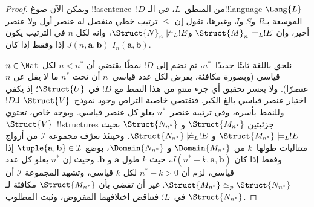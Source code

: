 \documentclass[../../../include/open-logic-section]{subfiles}
\begin{document}
\begin{proof}
ويمكن الآن صوغ !!a{sentence}~$!D$ من المنطق~$L$، في الـ!!{language}
$\Lang{L}$ الموسعة بـ$R$ و$S$ و$J$ وغيرها، تقول إن $\le$ ترتيب خطي
منفصل له عنصر أول ولا عنصر أخير، وإن
$\Struct{M}_n \models_L !E$ و$\Struct{N}_n \not\models_L !E$، وإنه لكل
$n$ في الترتيب يكون $J(n,\mathbf{a},\mathbf{b})$ إذا وفقط إذا كان
$I_n(\mathbf{a},\mathbf{b})$.

نلحق باللغة ثابتًا جديدًا~$n^*$، ثم نضم إلى $!D$ نمطًا يقتضي أن
$\bar n < n^*$ لكل $n \in \Nat$ قياسي (وبصورة مكافئة، يفرض لكل عدد
قياسي~$n$ أن تحت $n^*$ ما لا يقل عن $n$ عنصرًا). ولا يعسر تحقيق أي جزء منتهٍ من هذا
النمط مع $!D$ في $\Struct{U}$؛ إذ يكفي اختيار عنصر قياسي بالغ الكبر.
فتقتضي خاصية التراص وجود نموذج~$\Struct{V}$ لـ$!D$ وللنمط بأسره، وفي
ترتيبه عنصر~$n^*$ يعلو كل عنصر قياسي. وبوجه خاص، تحتوي
$\Struct{V}$~!!{structure}s جزئيتين $\Struct{M_{n^*}}$ و
$\Struct{N_{n^*}}$ بحيث $\Struct{M_{n^*}} \models_L !E$ و
$\Struct{N_{n^*}} \not\models_L !E$. وحينئذ نعرّف مجموعة
$\mathcal{I}$ من أزواج متتاليات طولها~$k$ من $\Domain{M_{n^*}}$ و
$\Domain{N_{n^*}}$، بوضع
$\tuple{\mathbf{a},\mathbf{b}} \in \mathcal{I}$ إذا وفقط إذا كان
$J(n^*-k,\mathbf{a},\mathbf{b})$، حيث $k$ طول $\mathbf{a}$ و
$\mathbf{b}$. وحيث إن $n^*$ يعلو كل عدد قياسي، لزم أن
$n^*-k>0$ لكل $k$ قياسي، وتشهد المجموعة $\mathcal{I}$ أن
$\Struct{M_{n^*}} \simeq_p \Struct{N_{n^*}}$. غير أن
 تقضي بأن $\Struct{M_{n^*}}$ مكافئة لـ
$\Struct{N_{n^*}}$ في~$L$؛ فتناقض اختلافهما المفروض، وثبت المطلوب.
\end{proof}
\end{document}
